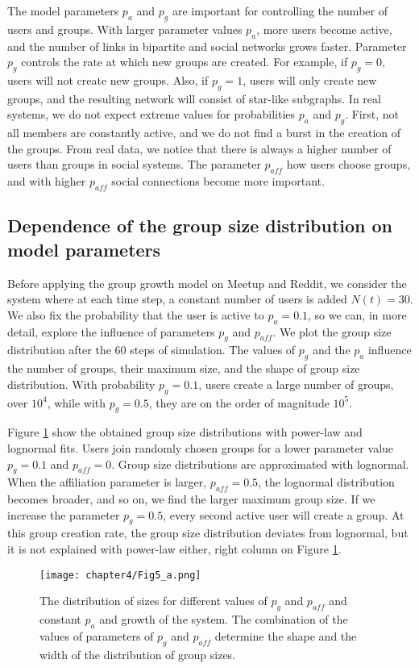 The model parameters $p_a$ and $p_g$ are important for controlling the number of users and groups. With larger parameter values $p_a$, more users become active, and the number of links in bipartite and social networks grows faster. Parameter $p_g$ controls the rate at which new groups are created. For example, if $p_g=0$, users will not create new groups. Also, if $p_g=1$, users will only create new groups, and the resulting network will consist of star-like subgraphs. In real systems, we do not expect extreme values for probabilities $p_a$ and $p_g$. First, not all members are constantly active, and we do not find a burst in the creation of the groups. From real data, we notice that there is always a higher number of users than groups in social systems. The parameter $p_{aff}$ how users choose groups, and with higher $p_{aff}$ social connections become more important. 

\subsection{Dependence of the group size distribution on model parameters}

Before applying the group growth model on Meetup and Reddit, we consider the system where at each time step, a constant number of users is added $N(t)=30$. We also fix the probability that the user is active to $p_a=0.1$, so we can, in more detail, explore the influence of parameters $p_g$ and $p_{aff}$. We plot the group size distribution after the $60$ steps of simulation. The values of $p_g$ and the $p_a$ influence the number of groups, their maximum size, and the shape of group size distribution. With probability $p_g=0.1$, users create a large number of groups, over $10^4$, while with $p_g=0.5$, they are on the order of magnitude $10^5$. 

Figure \ref{fig:n30} show the obtained group size distributions with power-law and lognormal fits. Users join randomly chosen groups for a lower parameter value $p_g=0.1$ and $p_{aff}=0$. Group size distributions are approximated with lognormal. When the affiliation parameter is larger, $p_{aff}=0.5$, the lognormal distribution becomes broader, and so on, we find the larger maximum group size. If we increase the parameter $p_g=0.5$, every second active user will create a group. At this group creation rate, the group size distribution deviates from lognormal, but it is not explained with power-law either, right column on Figure \ref{fig:n30}.

\begin{figure}[H]
	\centering
	\texttt{[image: chapter4/Fig5\_a.png]}
	\caption[Group size distribution for different model parameters]{The distribution of sizes for different values of $p_{g}$ and $p_{aff}$ and constant $p_{a}$ and growth of the system. The combination of the values of parameters of $p_{g}$ and $p_{aff}$ determine the shape and the width of the distribution of group sizes. }
	\label{fig:n30}
\end{figure}

